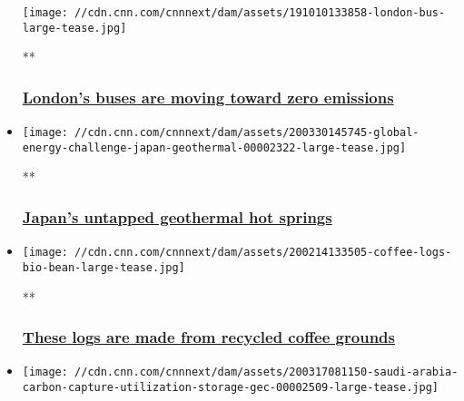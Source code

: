 \begin{itemize}
  \texttt{[image: //cdn.cnn.com/cnnnext/dam/assets/191010133858-london-bus-large-tease.jpg]}

  **

  \hypertarget{londons-buses-are-moving-toward-zero-emissions}{%
  \subsubsection{\texorpdfstring{\href{/videos/business/2019/10/10/london-zero-emissions-buses.cnn-business}{London's
  buses are moving toward zero
  emissions}}{London's buses are moving toward zero emissions}}\label{londons-buses-are-moving-toward-zero-emissions}}
\item
  \href{/videos/business/2020/03/30/global-energy-challenge-japan-geothermal.cnn}{}

  \texttt{[image: //cdn.cnn.com/cnnnext/dam/assets/200330145745-global-energy-challenge-japan-geothermal-00002322-large-tease.jpg]}

  **

  \hypertarget{japans-untapped-geothermal-hot-springs}{%
  \subsubsection{\texorpdfstring{\href{/videos/business/2020/03/30/global-energy-challenge-japan-geothermal.cnn}{Japan's
  untapped geothermal hot
  springs}}{Japan's untapped geothermal hot springs}}\label{japans-untapped-geothermal-hot-springs}}
\item
  \href{/videos/business/2020/02/14/coffee-grounds-recycling-gec.cnn-business}{}

  \texttt{[image: //cdn.cnn.com/cnnnext/dam/assets/200214133505-coffee-logs-bio-bean-large-tease.jpg]}

  **

  \hypertarget{these-logs-are-made-from-recycled-coffee-grounds}{%
  \subsubsection{\texorpdfstring{\href{/videos/business/2020/02/14/coffee-grounds-recycling-gec.cnn-business}{These
  logs are made from recycled coffee
  grounds}}{These logs are made from recycled coffee grounds}}\label{these-logs-are-made-from-recycled-coffee-grounds}}
\item
  \href{/videos/business/2020/03/17/saudi-arabia-carbon-capture-utilization-storage-gec.cnn-business}{}

  \texttt{[image: //cdn.cnn.com/cnnnext/dam/assets/200317081150-saudi-arabia-carbon-capture-utilization-storage-gec-00002509-large-tease.jpg]}


\end{itemize}

